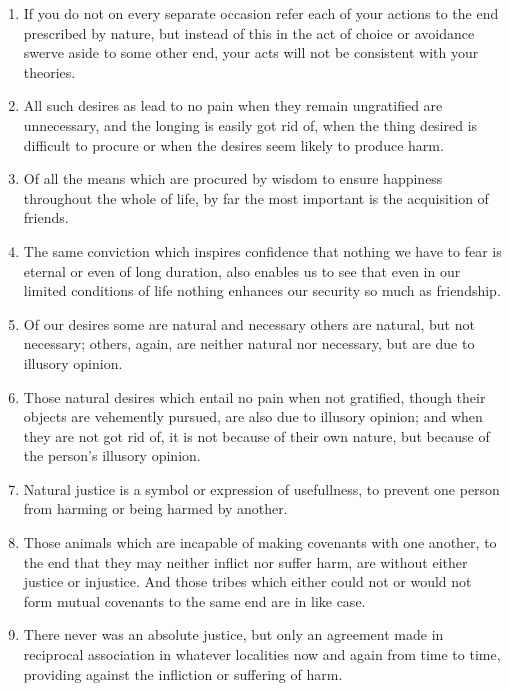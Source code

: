 \documentclass[12pt]{article}
\begin{document}
\begin{enumerate}[leftmargin=.5cm]
	\item If you do not on every separate occasion refer each of your actions to the end prescribed by nature, but instead of this in the act of choice or avoidance swerve aside to some other end, your acts will not be consistent with your theories. 

	\item All such desires as lead to no pain when they remain ungratified are unnecessary, and the longing is easily got rid of, when the thing desired is difficult to procure or when the desires seem likely to produce harm. 

	\item Of all the means which are procured by wisdom to ensure happiness throughout the whole of life, by far the most important is the acquisition of friends. 

	\item The same conviction which inspires confidence that nothing we have to fear is eternal or even of long duration, also enables us to see that even in our limited conditions of life nothing enhances our security so much as friendship. 

	\item Of our desires some are natural and necessary others are natural, but not necessary; others, again, are neither natural nor necessary, but are due to illusory opinion. 

	\item Those natural desires which entail no pain when not gratified, though their objects are vehemently pursued, are also due to illusory opinion; and when they are not got rid of, it is not because of their own nature, but because of the person's illusory opinion. 

	\item Natural justice is a symbol or expression of usefullness, to prevent one person from harming or being harmed by another. 

	\item Those animals which are incapable of making covenants with one another, to the end that they may neither inflict nor suffer harm, are without either justice or injustice. And those tribes which either could not or would not form mutual covenants to the same end are in like case.

	\item There never was an absolute justice, but only an agreement made in reciprocal association in whatever localities now and again from time to time, providing against the infliction or suffering of harm. 


\end{enumerate}
\end{document}
